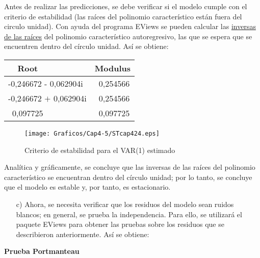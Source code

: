 Antes de realizar las predicciones, se debe verificar si el modelo cumple con el criterio de estabilidad (las ra\'{i}ces del polinomio caracter\'{i}stico est\'{a}n fuera del circulo unidad). Con ayuda del programa EViews se pueden calcular las \underline {inversas de las ra\'{i}ces} del polinomio caracter\'{i}stico autoregresivo, las que se espera que se encuentren dentro del c\'{i}rculo unidad. As\'{i} se obtiene:

\begin{table}[H]
\centering
\begin{tabular}{p{132pt}l}\hline\hline
~~Root & Modulus \\ \hline\hline
-0,246672 - 0,062904i & ~0,254566 \\
-0,246672 $+$ 0,062904i & ~0,254566 \\
~0,097725 & ~0,097725 \\ \hline\hline
\end{tabular}
\label{tab18}
\end{table}

\begin{figure}[H]
\centering
\texttt{[image: Graficos/Cap4-5/STcap424.eps]}
\caption{Criterio de estabilidad para el VAR(1) estimado}
\label{fig24}
\end{figure}

Anal\'{i}tica y gr\'{a}ficamente, se concluye que las inversas de las ra\'{i}ces del polinomio caracter\'{i}stico se encuentran dentro del c\'{i}rculo unidad; por lo tanto, se concluye que el modelo es estable y, por tanto, es estacionario.

\begin{enumerate}
      \item[c)] Ahora, se necesita verificar que los residuos del modelo sean ruidos blancos; en general, se prueba la independencia. Para ello, se utilizar\'{a} el paquete EViews para obtener las pruebas sobre los residuos que se describieron anteriormente. As\'{i} se obtiene:
\end{enumerate}

\textbf{Prueba Portmanteau}

